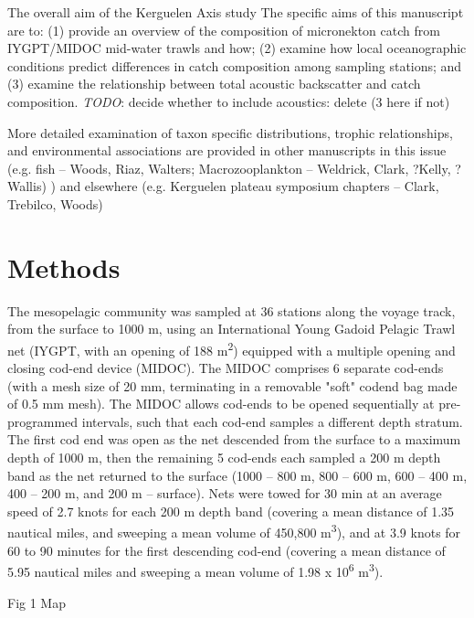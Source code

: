 \documentclass[12pt, fleqn]{article}
\begin{document}
{The overall aim of the Kerguelen Axis study
The specific aims of this manuscript are to: 
	(1) provide an overview of the composition of micronekton catch from IYGPT/MIDOC mid-water trawls and how;
	(2) examine how local oceanographic conditions predict differences in catch composition among sampling stations; and
	(3) examine the relationship between total acoustic backscatter and catch composition.
\emph{TODO}: decide whether to include acoustics: delete (3 here if not)


More detailed examination of taxon specific distributions, trophic relationships, and environmental associations are provided in other manuscripts in this issue (e.g.
fish -- Woods, Riaz, Walters; Macrozooplankton -- Weldrick, Clark, ?Kelly, ?Wallis)
)
and elsewhere (e.g. Kerguelen plateau symposium chapters -- Clark, Trebilco, Woods)


\section{Methods}

The mesopelagic community was sampled at 36 stations along the voyage track, from the surface to 1000 m, using an International Young Gadoid Pelagic Trawl net (IYGPT, with an opening of 188 m\textsuperscript{2}) equipped with a multiple opening and closing cod-end device (MIDOC). 
The MIDOC comprises 6 separate cod-ends (with a mesh size of 20 mm, terminating in a removable "soft" codend bag made of 0.5 mm mesh). 
The MIDOC allows cod-ends to be opened sequentially at pre-programmed intervals, such that each cod-end samples a different depth stratum.
The first cod end was open as the net descended from the surface to a maximum depth of 1000 m, then the remaining 5 cod-ends each sampled a 200 m depth band as the net returned to the surface (1000 – 800 m, 800 – 600 m, 600 – 400 m, 400 – 200 m, and 200 m – surface).
Nets were towed for 30 min at an average speed of 2.7 knots for each 200 m depth band (covering a mean distance of 1.35 nautical miles, and sweeping a mean volume of 450,800 m\textsuperscript{3}), and at 3.9 knots for 60 to 90 minutes for the first descending cod-end (covering a mean distance of 5.95 nautical miles and sweeping a mean volume of 1.98 x 10\textsuperscript{6} m\textsuperscript{3}). 

Fig 1 Map

}
\end{document}
